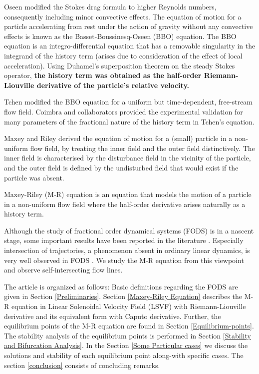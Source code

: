 \documentclass[pdflatex,sn-mathphys]{sn-jnl}%
\theoremstyle{thmstyleone}%
\theoremstyle{thmstyletwo}%
\theoremstyle{thmstylethree}%
\begin{document}
Oseen \cite{oseen1927hydromechanik} modified the Stokes drag formula to higher Reynolds numbers, consequently including minor convective effects. The equation of motion for a particle accelerating from rest under the action of gravity without any convective effects is known as the Basset-Boussinesq-Oseen (BBO) equation. The BBO equation is an integro-differential equation that has a removable singularity in the integrand of the history term (arises due to consideration of the effect of local acceleration). Using Duhamel's superposition theorem on the steady Stokes operator,  \textbf{the history term was obtained as the half-order Riemann-Liouville derivative of the particle's relative velocity.}

Tchen \cite{basset1887motion} modified the BBO equation for a uniform but time-dependent, free-stream flow field. Coimbra and collaborators \cite{coimbra2004experimental} provided the experimental validation for many parameters of the fractional nature of the history term in Tchen's equation.

Maxey and Riley \cite{maxey1983equation} derived the equation of motion for a (small) particle in a non-uniform flow field, by treating the inner field and the outer field distinctively. The inner field is characterised by the disturbance field in the vicinity of the particle, and the outer field is defined by the undisturbed field that would exist if the particle was absent. 

Maxey-Riley (M-R) equation \cite{maxey1983equation} is an equation that models the motion of a particle in a non-uniform flow field where the half-order derivative arises naturally as a history term.

Although the study of fractional order dynamical systems (FODS) is in a nascent stage, some important results have been reported in the literature \cite{matignon1996stability,kaslik2012non}. Especially intersection of trajectories, a phenomenon absent in ordinary linear dynamics, is very well observed in FODS \cite{magin2010fractional, deshpande2018analysis, bhalekar2018singular}. We study the M-R equation from this viewpoint and observe self-intersecting flow lines.

The article is organized as follows:
Basic definitions regarding the FODS are given in Section \ref{Preliminaries}. Section \ref{Maxey-Riley Equation} describes the M-R equation in Linear Solenoidal Velocity Field (LSVF) with Riemann-Liouville derivative and its equivalent form with Caputo derivative. Further, the  equilibrium points of the M-R equation are found in Section \ref{Equilibrium-points}. %
The stability analysis of the equilibrium points is performed in Section \ref{Stability and Bifurcation Analysis}. In the Section \ref{Some Particular cases} we discuss the solutions and stability of each equilibrium point along-with specific cases. The section \ref{conclusion} consists of concluding remarks.
\end{document}
